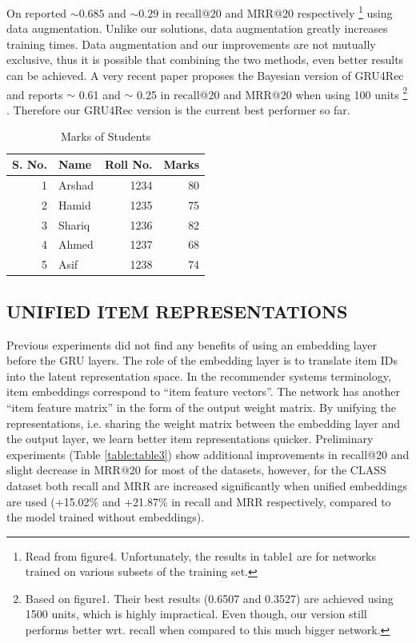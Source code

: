 On \cite{tan2016improved} reported $∼ 0.685$ and $∼ 0.29$ in recall@20 and MRR@20 respectively \footnote[11]{Read from figure4. Unfortunately, the results in table1 are for networks trained on various subsets of the
training set.} using data augmentation. Unlike our solutions, data augmentation greatly increases training
times. Data augmentation and our improvements are not mutually exclusive, thus it is possible that
combining the two methods, even better results can be achieved. A very recent paper \cite{chatzis2017recurrent} proposes the Bayesian version of GRU4Rec and reports $\sim $ 0.61 and $\sim $ 0.25 in recall@20 and MRR@20 when using 100 units \footnote[12]{Based on figure1. Their best results (0.6507 and 0.3527) are achieved using 1500 units, which is highly impractical. Even though, our version still performs better wrt. recall when compared to this much bigger network.} . Therefore our GRU4Rec version is the current best performer so far.


\begin{table}[htbp]
\label{table:table3}
  \centering
  \caption{Marks of Students}
    \begin{tabular}{|r|l|r|r|}
		\hline
    S. No. &Name& Roll No. &Marks \\
		\hline
    1     & Arshad & 1234  & 80 \\
    2     & Hamid & 1235  & 75 \\
    3     & Shariq & 1236  & 82 \\
    4     & Ahmed & 1237  & 68 \\
    5     & Asif  & 1238  & 74 \\
		\hline
		\hline
    \end{tabular}%
  \label{tab:addlabel}%
\end{table}%


\subsection{UNIFIED ITEM REPRESENTATIONS}
Previous experiments did not find any benefits of using an embedding layer before the GRU layers. The role of the embedding layer is to translate item IDs into the latent representation space. In the recommender systems terminology, item embeddings correspond to “item feature vectors”. The network has another “item feature matrix” in the form of the output weight matrix. By unifying the representations, i.e. sharing the weight matrix between the embedding layer and the output layer, we learn better item representations quicker. Preliminary experiments (Table \ref{table:table3}) show additional improvements in recall@20 and slight decrease in MRR@20 for most of the datasets, however, for the CLASS dataset both recall and MRR are increased significantly when unified embeddings are used (+15.02\% and +21.87\% in recall and MRR respectively, compared to the model trained
without embeddings).



